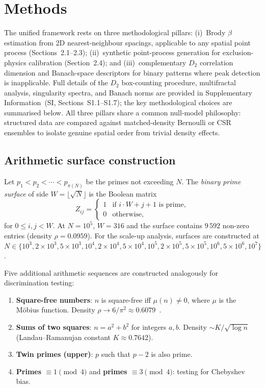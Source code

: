 \documentclass[final,1p,times]{elsarticle}
\theoremstyle{definition}
\begin{document}
\section{Methods}

The unified framework rests on three methodological pillars:
(i)~Brody $\beta$ estimation from 2D nearest-neighbour spacings,
applicable to any spatial point process (Sections~2.1--2.3);
(ii)~synthetic point-process generation for exclusion-physics
calibration (Section~2.4); and (iii)~complementary $D_2$ correlation
dimension and Banach-space descriptors for binary patterns where peak
detection is inapplicable. Full details of the $D_2$ box-counting
procedure, multifractal analysis, singularity spectra, and Banach
norms are provided in Supplementary Information~(SI, Sections~S1.1--S1.7);
the key methodological choices are summarised below. All three pillars
share a common null-model philosophy: structured data are compared against
matched-density Bernoulli or CSR ensembles to isolate genuine
spatial order from trivial density effects.

\subsection{Arithmetic surface construction}

Let $p_1 < p_2 < \cdots < p_{\pi(N)}$ be the primes not exceeding $N$.
The \emph{binary prime surface} of side $W = \lfloor\sqrt{N}\rfloor$ is
the Boolean matrix
\begin{equation}
  Z_{ij} = \begin{cases}
    1 & \text{if } i \cdot W + j + 1 \text{ is prime}, \\
    0 & \text{otherwise},
  \end{cases}
  \label{eq:binary}
\end{equation}
for $0 \leq i, j < W$. At $N=10^5$, $W=316$ and the surface contains
$9\,592$ non-zero entries (density $\rho = 0.0959$). For the scale-up
analysis, surfaces are constructed at
$N \in \{10^3, 2\times10^3, 5\times10^3, 10^4, 2\times10^4, 5\times10^4,
10^5, 2\times10^5, 5\times10^5, 10^6, 5\times10^6, 10^7\}$.

Five additional arithmetic sequences are constructed analogously for
discrimination testing:
\begin{enumerate}
  \item \textbf{Square-free numbers}: $n$ is square-free iff
        $\mu(n) \neq 0$, where $\mu$ is the M\"obius function.
        Density $\rho \to 6/\pi^2 \approx 0.6079$~\cite{HARDY-WRIGHT}.
  \item \textbf{Sums of two squares}: $n = a^2 + b^2$ for integers
        $a, b$. Density $\sim K/\sqrt{\log n}$ (Landau--Ramanujan
        constant $K \approx 0.7642$).
  \item \textbf{Twin primes (upper)}: $p$ such that $p-2$ is also prime.
  \item \textbf{Primes $\equiv 1 \pmod 4$} and
        \textbf{primes $\equiv 3 \pmod 4$}: testing for Chebyshev bias.
\end{enumerate}
\end{document}
